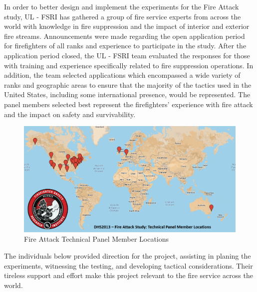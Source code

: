 \documentclass{article}
\begin{document}
In order to better design and implement the experiments for the Fire Attack study, UL - FSRI has gathered a group of fire service experts from across the world with knowledge in fire suppression and the impact of interior and exterior fire streams. Announcements were made regarding the open application period for firefighters of all ranks and experience to participate in the study. After the application period closed, the UL - FSRI team evaluated the responses for those with training and experience specifically related to fire suppression operations. In addition, the team selected applications which encompassed a wide variety of ranks and geographic areas to ensure that the majority of the tactics used in the United States, including some international presence, would be represented. The panel members selected best represent the firefighters' experience with fire attack and the impact on safety and survivability.

\begin{figure}[H]
	\centering
	\includegraphics[width = 5in]{Figures/General/Technical_Panel_Logos.png} 
	\caption{Fire Attack Technical Panel Member Locations}
	\label{fig:PanelLocatoins}
\end{figure} 

\clearpage

The individuals below provided direction for the project, assisting in planing the experiments, witnessing the testing, and developing tactical considerations. Their tireless support and effort make this project relevant to the fire service across the world. 

\renewcommand{\arraystretch}{1.5}
\end{document}
